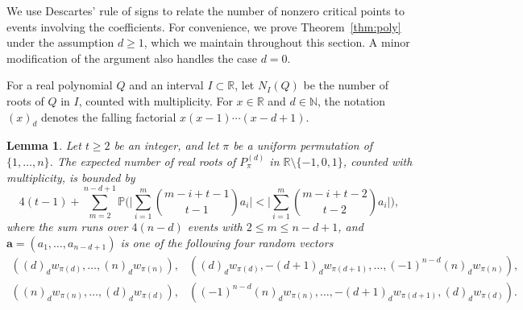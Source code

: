 \documentclass[reqno]{amsart}
\newcommand\R{{\mathbb{R}}}
\renewcommand\P{{\mathbb{P}}}
\theoremstyle{plain}
\newtheorem{lemma}[theorem]{Lemma}
\theoremstyle{definition}
\begin{document}
We use Descartes’ rule of signs to relate the number of nonzero critical points to events involving the coefficients. For convenience, we prove Theorem~\ref{thm:poly} under the assumption $d\ge 1$, which we maintain throughout this section. A minor modification of the argument also handles the case $d=0$.

For a real polynomial $Q$ and an interval $I \subset \mathbb{R}$, let $N_I(Q)$ be the number of roots of $Q$ in $I$, counted with multiplicity. For $x \in \mathbb{R}$ and $d \in \mathbb{N}$, the notation $(x)_d$ denotes the falling factorial $x(x - 1)\cdots(x - d + 1)$.

\begin{lemma}\label{lemma:Descartes}
Let $t \ge 2$ be an integer, and let $\pi$ be a uniform permutation %
of $\{1,\ldots,n\}$. The expected number of real roots of $P_{\pi}^{(d)}$ in $\R \setminus \{-1,0,1\}$, counted with multiplicity, is bounded by 
\[
4(t-1) + \sum_{m=2}^{n-d+1}  \P\Big(\Big| \sum_{i=1}^{m} \binom{m-i+t-1}{t-1} a_{i} \Big|<\Big| \sum_{i=1}^{m} \binom{m-i+t-2}{t-2} a_{i} \Big| \Big),
\]
where the sum runs over $4(n-d)$ events with $2 \le m \le n-d+1$, and $ \bm{a}=(a_1,\ldots,a_{n-d+1})$ is one of the following four random vectors
\[
\begin{array}{cc}
((d)_{d}w_{\pi(d)}, \dots, (n)_{d} w_{\pi(n)}), 
& ((d)_{d}w_{\pi(d)}, -(d+1)_{d} w_{\pi(d+1)}, \ldots, (-1)^{n-d} (n)_{d} w_{\pi(n)}), \\[3pt]
((n)_{d} w_{\pi(n)}, \ldots, (d)_{d} w_{\pi(d)}), 
& ((-1)^{n-d}(n)_{d} w_{\pi(n)}, \ldots, -(d+1)_{d} w_{\pi(d+1)}, (d)_{d} w_{\pi(d)}).
\end{array}
\]
\end{lemma}
\end{document}
